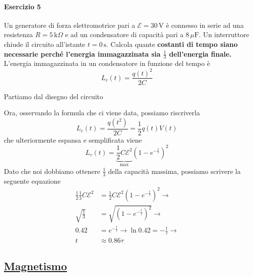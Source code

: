 \paragraph{Esercizio 5}
Un generatore di forza elettromotrice pari a $\mathcal{E} = 30\,\text{V}$ è connesso in serie ad
una resistenza $R=5\,\text{k}\Omega$ e ad un condensatore di capacità pari a $8\,\mu\text{F}$.
Un interruttore chiude il circuito all'istante $t=0\,\text{s}$. Calcola quante \textbf{costanti di
tempo siano necessarie perché l'energia immagazzinata sia $\frac{1}{3}$ dell'energia finale.}\\ 
L'energia immagazzinata in un condensatore in funzione del tempo è
\begin{equation*}
  L_c(t) = \frac{q(t)^2}{2C}
\end{equation*}
\divisor

Partiamo dal disegno del circuito
\begin{center}
\end{center}

Ora, osservando la formula che ci viene data, possiamo riscriverla
\begin{equation*}
  L_c(t) = \frac{q(t^2)}{2C} = \frac{1}{2}q(t)V(t)
\end{equation*}
che ulteriormente espansa e semplificata viene
\begin{equation*}
  L_c(t) = \underbrace{\frac{1}{2}C\mathcal{E}^2}_{\text{max}} \left( 1-e^{-\frac{t}{\tau}} \right)^2 
\end{equation*}
Dato che noi dobbiamo ottenere $\frac{1}{3}$ della capacità massima, possiamo scrivere la
seguente equazione
\begin{align*}
  \frac{1}{2}\frac{1}{3}C\mathcal{E}^2 &= \frac{1}{2}C\mathcal{E}^2 \left( 1-e^{-\frac{t}{\tau}} \right)^2 \rightarrow \\
  \sqrt{\frac{1}{3}} &= \sqrt{\left( 1-e^{-\frac{t}{\tau}} \right)^2} \rightarrow \\
  0.42 &= e^{-\frac{t}{\tau}} \rightarrow \ln0.42 = -\frac{t}{\tau} \rightarrow \\
  t &\approx\boxed{0.86\tau}
\end{align*}
\subsection*{\hyperref[sec:magnetismo]{Magnetismo}}\label{ex:magnetismo}
